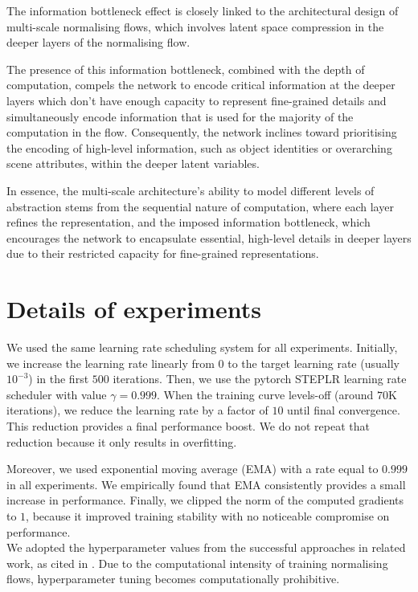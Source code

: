 The information bottleneck effect is closely linked to the architectural design of multi-scale normalising flows, which involves latent space compression in the deeper layers of the normalising flow.

The presence of this information bottleneck, combined with the depth of computation, compels the network to encode critical information at the deeper layers which don't have enough capacity to represent fine-grained details and simultaneously encode information that is used for the majority of the computation in the flow. Consequently, the network inclines toward prioritising the encoding of high-level information, such as object identities or overarching scene attributes, within the deeper latent variables.

In essence, the multi-scale architecture's ability to model different levels of abstraction stems from the sequential nature of computation, where each layer refines the representation, and the imposed information bottleneck, which encourages the network to encapsulate essential, high-level details in deeper layers due to their restricted capacity for fine-grained representations.
\color{black}

\section{Details of experiments}\label{ch1:sec:details-of-experiments}
We used the same learning rate scheduling system for all experiments. Initially, we increase the learning rate linearly from $0$ to the target learning rate (usually $10^{-3}$) in the first $500$ iterations. Then, we use the pytorch STEPLR learning rate scheduler with value $\gamma = 0.999$. When the training curve levels-off (around $70$K iterations), we reduce the learning rate by a factor of $10$ until final convergence. This reduction provides a final performance boost. We do not repeat that reduction because it only results in overfitting. 

Moreover, we used exponential moving average (EMA) with a rate equal to $0.999$ in all experiments. We empirically found that EMA consistently provides a small increase in performance. Finally, we clipped the norm of the computed gradients to $1$, because it improved training stability with no noticeable compromise on performance. \\
 We adopted the hyperparameter values from the successful approaches in related work, as cited in \cite{Dual-Glow}. Due to the computational intensity of training normalising flows, hyperparameter tuning becomes computationally prohibitive.\color{black}


